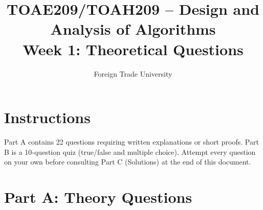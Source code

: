 \documentclass[11pt]{article}
\title{TOAE209/TOAH209 -- Design and Analysis of Algorithms\\[4pt]
\large Week 1: Theoretical Questions}
\author{Foreign Trade University}
\date{}
\begin{document}
\maketitle

\section*{Instructions}

Part A contains 22 questions requiring written explanations or short proofs. Part B is a
10-question quiz (true/false and multiple choice). Attempt every question on your own
before consulting Part C (Solutions) at the end of this document.

\section*{Part A: Theory Questions}
\end{document}

